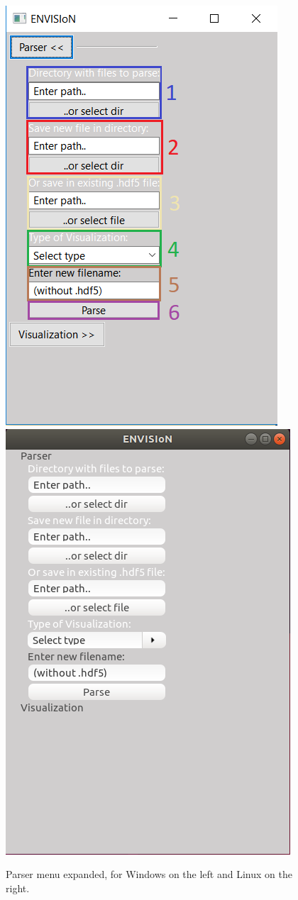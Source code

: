 \begin{figure}[ht]
    \centering
    \includegraphics[angle=0,scale=0.6]{images/GUIParser.png}
    \includegraphics[angle=0,scale=0.356]{images/GUIParserLinux.png}
    \caption{Parser menu expanded, for Windows on the left and Linux on the right.}
    \label{fig:GUIParserWindows}
\end{figure}

